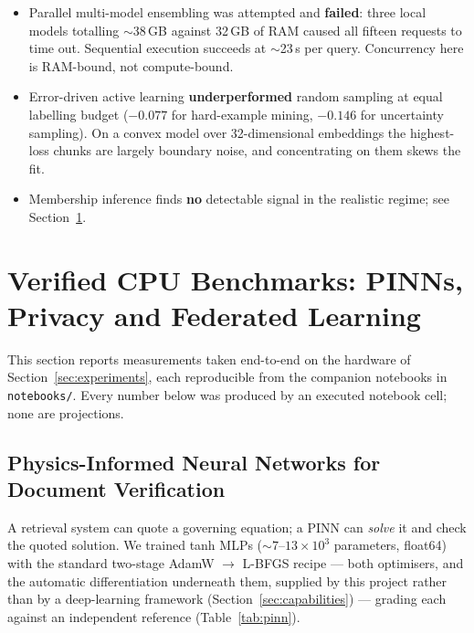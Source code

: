 \documentclass[11pt,a4paper]{article}
\theoremstyle{plain}
\theoremstyle{definition}
\begin{document}
\begin{itemize}
    \item Parallel multi-model ensembling was attempted and \textbf{failed}:
          three local models totalling $\sim$38\,GB against 32\,GB of RAM
          caused all fifteen requests to time out. Sequential execution
          succeeds at $\sim$23\,s per query. Concurrency here is RAM-bound,
          not compute-bound.
    \item Error-driven active learning \textbf{underperformed} random
          sampling at equal labelling budget ($-0.077$ for hard-example
          mining, $-0.146$ for uncertainty sampling). On a convex model over
          32-dimensional embeddings the highest-loss chunks are largely
          boundary noise, and concentrating on them skews the fit.
    \item Membership inference finds \textbf{no} detectable signal in the
          realistic regime; see Section~\ref{sec:verified}.
\end{itemize}

\section{Verified CPU Benchmarks: PINNs, Privacy and Federated Learning}
\label{sec:verified}

This section reports measurements taken end-to-end on the hardware of
Section~\ref{sec:experiments}, each reproducible from the companion notebooks
in \texttt{notebooks/}. Every number below was produced by an executed
notebook cell; none are projections.

\subsection{Physics-Informed Neural Networks for Document Verification}
\label{sec:pinn-verify}

A retrieval system can quote a governing equation; a PINN can \emph{solve} it
and check the quoted solution. We trained tanh MLPs
($\sim$$7$--$13\times10^{3}$ parameters, float64) with the standard two-stage
AdamW $\rightarrow$ L-BFGS recipe --- both optimisers, and the automatic
differentiation underneath them, supplied by this project rather than by a
deep-learning framework (Section~\ref{sec:capabilities}) --- grading each
against an independent reference (Table~\ref{tab:pinn}).
\end{document}
